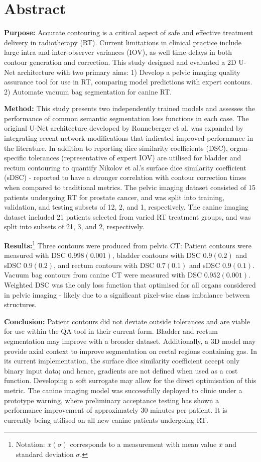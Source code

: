 \chapter{Abstract} \label{ch:abstract}

\textbf{Purpose:} Accurate contouring is a critical aspect of safe and effective
treatment delivery in radiotherapy (RT). Current limitations in clinical
practice include large intra and inter-observer variances (IOV), as well time
delays in both contour generation and correction. This study designed and
evaluated a 2D U-Net architecture with two primary aims:
1) Develop a pelvic imaging quality assurance tool for use in
RT, comparing model predictions with expert contours. 2) Automate vacuum bag
segmentation for canine RT.

\textbf{Method:} This study presents two independently trained models and
assesses the performance of common semantic segmentation loss functions in each
case. The original U-Net architecture developed by Ronneberger et al. was
expanded by integrating recent network modifications that indicated improved
performance in the literature. In addition to reporting dice similarity
coefficients (DSC), organ-specific tolerances (representative of expert IOV) are
utilised for bladder and rectum contouring to quantify Nikolov et al.'s surface
dice similarity coefficient (sDSC) - reported to have a stronger
correlation with contour correction times when compared to traditional metrics.
The pelvic imaging dataset consisted of 15 patients undergoing RT for prostate
cancer, and was split into training, validation, and testing subsets of 12, 2,
and 1, respectively. The canine imaging dataset included 21 patients selected
from varied RT treatment groups, and was split into subsets of 21, 3, and 2,
respectively.

\textbf{Results:}\footnote{Notation: $\bar{x}(\sigma)$ corresponds to a
measurement with mean value $\bar{x}$ and standard deviation $\sigma$.} Three
contours were produced from pelvic CT: Patient contours were measured with DSC
$0.998(0.001)$, bladder contours with DSC $0.9(0.2)$ and sDSC $0.9(0.2)$, and
rectum contours with DSC $0.7(0.1)$ and sDSC $0.9(0.1)$. Vacuum bag contours
from canine CT were measured with DSC $0.952(0.001)$. Weighted DSC was the only
loss function that optimised for all organs considered in pelvic imaging -
likely due to a significant pixel-wise class imbalance between structures.

\textbf{Conclusion:} Patient contours did not deviate outside tolerances and are
viable for use within the QA tool in their current form. Bladder and rectum
segmentation may improve with a broader dataset. Additionally, a 3D model may
provide axial context to improve segmentation on rectal regions containing gas.
In its current implementation, the surface dice similarity coefficient accept
only binary input data; and hence, gradients are not defined when used as a cost
function. Developing a soft surrogate may allow for the direct optimisation of
this metric. The canine imaging model was successfully deployed to clinic under
a prototype warning, where preliminary acceptance testing has shown a
performance improvement of approximately 30 minutes per patient. It is currently
being utilised on all new canine patients undergoing RT.